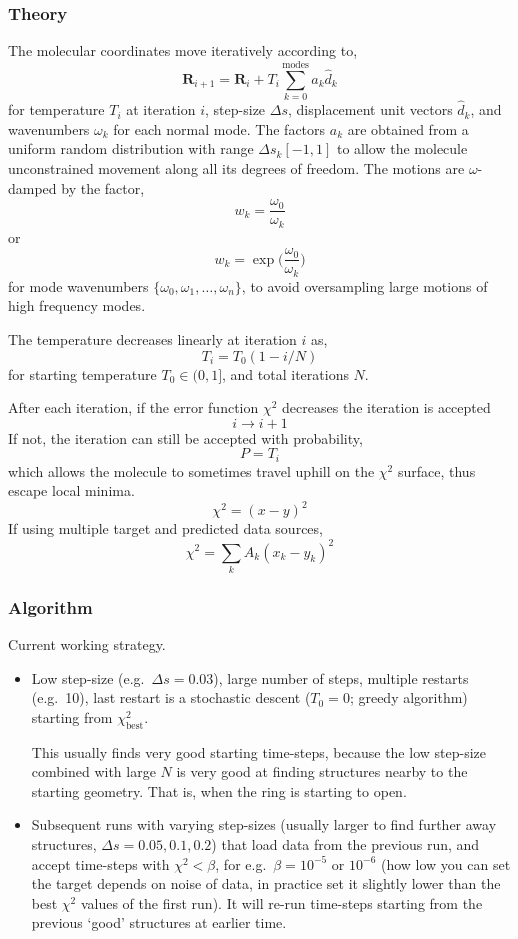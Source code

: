 \documentclass[]{article}
\begin{document}
	\subsubsection{Theory}
	The molecular coordinates move iteratively according to,
	\[
	\textbf{R}_{i+1} = \textbf{R}_{i} + T_i\sum_{k=0}^{\textrm{modes}}a_k\hat{d}_k
	\]
	for temperature $T_i$ at iteration $i$, step-size $\Delta s$, displacement unit vectors $\hat{d}_k$, and wavenumbers $\omega_k$ for each normal mode. The factors $a_k$ are obtained from a uniform random distribution with range $\Delta s_k[-1, 1]$ to allow the molecule unconstrained movement along all its degrees of freedom.
	The motions are $\omega$-damped by the factor,
	\[
	w_k = \frac{\omega_0}{\omega_k}
	\]
	or
	\[
	w_k = \exp\Big(\frac{\omega_0}{\omega_k}\Big)
	\]
	for mode wavenumbers $\{\omega_0, \omega_1, \dots, \omega_n\}$, to avoid oversampling large motions of high frequency modes.
	
	The temperature decreases linearly at iteration $i$ as,
	\[
	T_i = T_0(1 - i / N)
	\]
	for starting temperature $T_0\in(0, 1]$, and total iterations $N$.
	
	After each iteration, if the error function $\chi^2$ decreases the iteration is accepted
	\[
	i\rightarrow i+1
	\]
	If not, the iteration can still be accepted with probability,
	\[
	P = T_i
	\]
	which allows the molecule to sometimes travel uphill on the $\chi^2$ surface, thus escape local minima.
	\[
	\chi^2 = (x-y)^2
	\]
	If using multiple target and predicted data sources,
	\[
	\chi^2 = \sum_k A_k(x_k-y_k)^2
	\]


	\subsubsection{Algorithm}
	Current working strategy.
	
	\begin{itemize}
		
		\item	Low step-size (e.g.\ $\Delta s = 0.03$), large number of steps, multiple restarts (e.g.\ 10), last restart is a stochastic descent ($T_0 = 0$; greedy algorithm) starting from $\chi^2_\textrm{best}$.
		
		This usually finds very good starting time-steps, because the low step-size combined with large $N$ is very good at finding structures nearby to the starting geometry. That is, when the ring is starting to open.
		
		\item Subsequent runs with varying step-sizes (usually larger to find further away structures, $\Delta s = 0.05, 0.1, 0.2$) that load data from the previous run, and accept time-steps with $\chi^2 < \beta$, for e.g.\ $\beta = 10^{-5}$ or $10^{-6}$ (how low you can set the target depends on noise of data, in practice set it slightly lower than the best $\chi^2$ values of the first run). It will re-run time-steps starting from the previous `good' structures at earlier time. 
		
	\end{itemize}
	
\end{document}
